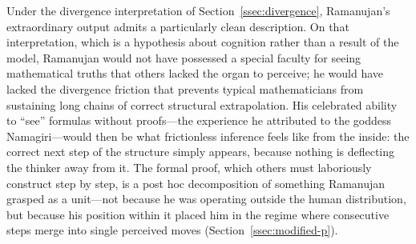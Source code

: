 \documentclass{article}
\begin{document}
Under the divergence interpretation of Section~\ref{ssec:divergence}, Ramanujan's extraordinary output admits a particularly clean description. On that interpretation, which is a hypothesis about cognition rather than a result of the model, Ramanujan would not have possessed a special faculty for seeing mathematical truths that others lacked the organ to perceive; he would have lacked the divergence friction that prevents typical mathematicians from sustaining long chains of correct structural extrapolation. His celebrated ability to ``see'' formulas without proofs---the experience he attributed to the goddess Namagiri---would then be what frictionless inference feels like from the inside: the correct next step of the structure simply appears, because nothing is deflecting the thinker away from it. The formal proof, which others must laboriously construct step by step, is a post hoc decomposition of something Ramanujan grasped as a unit---not because he was operating outside the human distribution, but because his position within it placed him in the regime where consecutive steps merge into single perceived moves (Section~\ref{ssec:modified-p}).
\end{document}
